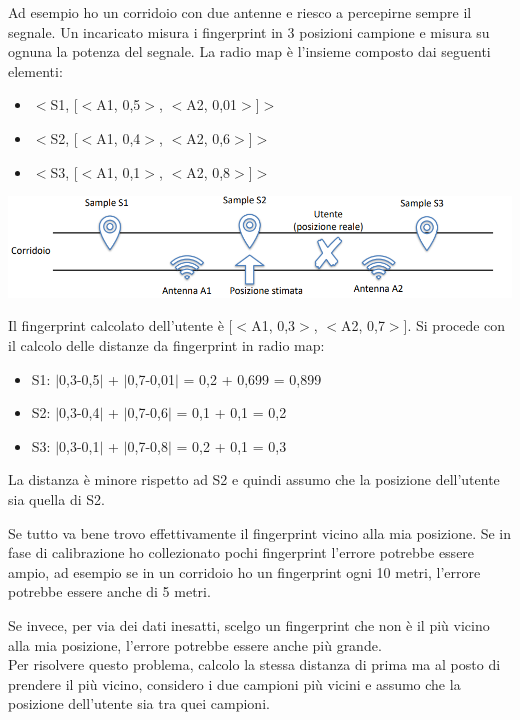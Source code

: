 Ad esempio ho un corridoio con due antenne e riesco a percepirne sempre il segnale. Un incaricato misura i fingerprint in 3 posizioni campione e misura su ognuna la potenza del segnale. 
La radio map è l'insieme composto dai seguenti elementi: 
\begin{itemize}
    \item $<$S1, [$<$A1, 0,5$>$, $<$A2, 0,01$>$]$>$
    \item $<$S2, [$<$A1, 0,4$>$, $<$A2, 0,6$>$]$>$
    \item $<$S3, [$<$A1, 0,1$>$, $<$A2, 0,8$>$]$>$
\end{itemize}

\includegraphics[width = \textwidth]{images/MobiDEV/1. posizionamento indoor/fingerprinting 2.PNG}

Il fingerprint calcolato dell'utente è [$<$A1, 0,3$>$, $<$A2, 0,7$>$].
Si procede con il calcolo delle distanze da fingerprint in radio map:
\begin{itemize}
    \item S1: $|$0,3-0,5$|$ + $|$0,7-0,01$|$ = 0,2 + 0,699 = 0,899
    \item S2: $|$0,3-0,4$|$ + $|$0,7-0,6$|$ = 0,1 + 0,1 = 0,2
    \item S3: $|$0,3-0,1$|$ + $|$0,7-0,8$|$ = 0,2 + 0,1 = 0,3
\end{itemize}
La distanza è minore rispetto ad S2 e quindi assumo che la posizione dell'utente sia quella di S2. 

Se tutto va bene trovo effettivamente il fingerprint vicino alla mia posizione. Se in fase di calibrazione ho collezionato pochi fingerprint l’errore potrebbe essere ampio, ad esempio se in un corridoio ho un fingerprint ogni 10 metri, l’errore potrebbe essere anche di 5 metri. 

Se invece, per via dei dati inesatti, scelgo un fingerprint che non è il più vicino alla mia posizione, l’errore potrebbe essere anche più grande.
\\ Per risolvere questo problema, calcolo la stessa distanza di prima ma al posto di prendere il più vicino, considero i due campioni più vicini e assumo che la posizione dell'utente sia tra quei campioni. 

